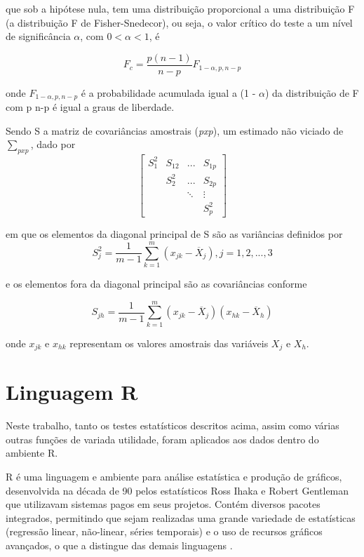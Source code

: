que sob a hipótese nula, tem uma distribuição proporcional a uma distribuição F (a distribuição F de Fisher-Snedecor), ou seja, o valor crítico do teste a um nível de significância $\alpha$, com $0 < \alpha < 1$, é

\begin{equation}
F_c = \frac{p(n-1)}{n-p} F_{1-\alpha, p, n - p}
\label{eq:eq5}
\end{equation}

onde $F_{1-\alpha, p, n - p}$ é a probabilidade acumulada igual a (1 - $\alpha$) da distribuição de F com p
n-p é igual a graus de liberdade.

Sendo S a matriz de covariâncias amostrais (\textit{pxp}), um estimado não viciado de $\sum_{pxp}$, dado por
\begin{equation}
\begin{bmatrix}
S^{2}_{1} & S_{12} & ... & S_{1p} \\ 
 & S^{2}_{2} & ... & S_{2p} \\ 
 &  & \ddots  & \vdots  \\ 
 &  &  & S^{2}_{p}
\end{bmatrix}
 \label{eq:eq6}
\end{equation}

em que os elementos da diagonal principal de S são as variâncias definidos por
\begin{equation}
S^2_j = \frac{1}{m-1} \sum_{k=1}^m (x_{jk} - \overline{X}_j),    j = 1, 2, ..., 3 
\label{eq:eq7}
\end{equation}

e os elementos fora da diagonal principal são as covariâncias conforme

\begin{equation}
S_{jh} = \frac{1}{m-1} \sum_{k=1}^m (x_{jk} - \overline{X}_j)(x_{hk} - \overline{X}_h) 
\label{eq:eq8}
\end{equation}

onde $x_{jk}$ e $x_{hk}$ representam os valores amostrais das variáveis $X_j$ e $X_h$.

\section{Linguagem R}

Neste trabalho, tanto os testes estatísticos descritos acima, assim como várias outras funções de variada utilidade, foram aplicados aos dados dentro do ambiente R.

R é uma linguagem e ambiente para análise estatística e produção de gráficos, desenvolvida na década de 90 pelos estatísticos Ross Ihaka e Robert Gentleman que utilizavam sistemas pagos em seus projetos. Contém diversos pacotes integrados, permitindo que sejam realizadas uma grande variedade de estatísticas (regressão linear, não-linear, séries temporais) e o uso de recursos gráficos avançados, o que a distingue das demais linguagens \cite{languageR}. 

